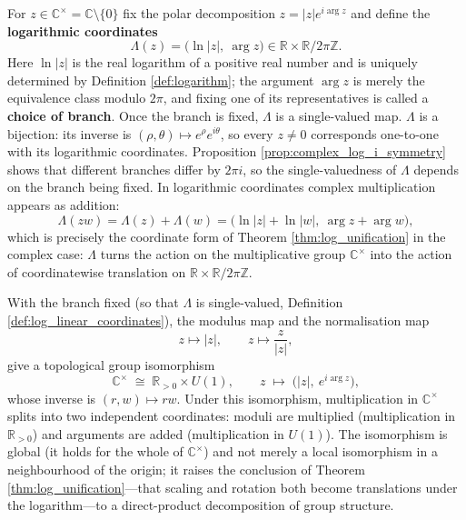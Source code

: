 \begin{definition}\label{def:log_linear_coordinates}
For $z\in\mathbb{C}^{\times}=\mathbb{C}\setminus\{0\}$ fix the polar decomposition $z=|z|e^{i\arg z}$ and define the \textbf{logarithmic coordinates}
\[
\Lambda(z)=\bigl(\ln|z|,\ \arg z\bigr)\in\mathbb{R}\times\mathbb{R}/2\pi\mathbb{Z}.
\]
Here $\ln|z|$ is the real logarithm of a positive real number and is uniquely determined by Definition \ref{def:logarithm}; the argument $\arg z$ is merely the equivalence class modulo $2\pi$, and fixing one of its representatives is called a \textbf{choice of branch}. Once the branch is fixed, $\Lambda$ is a single-valued map. $\Lambda$ is a bijection: its inverse is $(\rho,\theta)\mapsto e^{\rho}e^{i\theta}$, so every $z\neq0$ corresponds one-to-one with its logarithmic coordinates. Proposition \ref{prop:complex_log_i_symmetry} shows that different branches differ by $2\pi i$, so the single-valuedness of $\Lambda$ depends on the branch being fixed. In logarithmic coordinates complex multiplication appears as addition:
\[
\Lambda(zw)=\Lambda(z)+\Lambda(w)=\bigl(\ln|z|+\ln|w|,\ \arg z+\arg w\bigr),
\]
which is precisely the coordinate form of Theorem \ref{thm:log_unification} in the complex case: $\Lambda$ turns the action on the multiplicative group $\mathbb{C}^{\times}$ into the action of coordinatewise translation on $\mathbb{R}\times\mathbb{R}/2\pi\mathbb{Z}$.
\end{definition}

\begin{theorem}\label{thm:complex_multiplication_decoupling}
With the branch fixed (so that $\Lambda$ is single-valued, Definition \ref{def:log_linear_coordinates}), the modulus map and the normalisation map
\[
z\mapsto|z|,\qquad z\mapsto\frac{z}{|z|},
\]
give a topological group isomorphism
\[
\mathbb{C}^{\times}\;\cong\;\mathbb{R}_{>0}\times U(1),\qquad
z\;\longmapsto\;\bigl(|z|,\ e^{i\arg z}\bigr),
\]
whose inverse is $(r,w)\mapsto rw$. Under this isomorphism, multiplication in $\mathbb{C}^{\times}$ splits into two independent coordinates: moduli are multiplied (multiplication in $\mathbb{R}_{>0}$) and arguments are added (multiplication in $U(1)$). The isomorphism is global (it holds for the whole of $\mathbb{C}^{\times}$) and not merely a local isomorphism in a neighbourhood of the origin; it raises the conclusion of Theorem \ref{thm:log_unification}---that scaling and rotation both become translations under the logarithm---to a direct-product decomposition of group structure.
\end{theorem}

